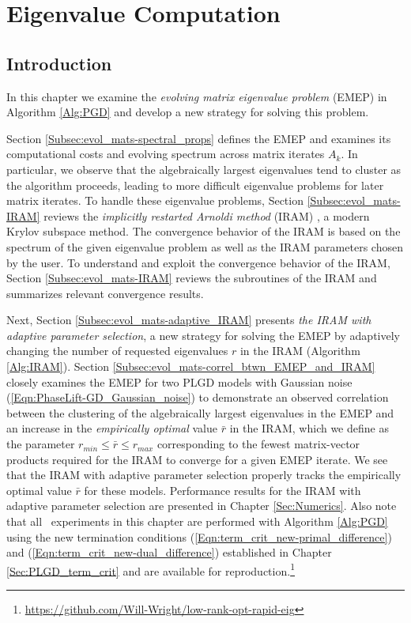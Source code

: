 \chapter{Eigenvalue Computation}		\label{Sec:evol_mats}



\section{Introduction}   \label{Subsec:evol_mats-intro}


In this chapter we examine the \textit{evolving matrix eigenvalue problem} (EMEP) in Algorithm \ref{Alg:PGD} and develop a new strategy for solving this problem.


Section \ref{Subsec:evol_mats-spectral_props} defines the EMEP and examines its computational costs and evolving spectrum across matrix iterates $A_k$.  
In particular, we observe that the algebraically largest eigenvalues tend to cluster as the algorithm proceeds, leading to more difficult eigenvalue problems for later matrix iterates.  
To handle these eigenvalue problems, Section \ref{Subsec:evol_mats-IRAM} reviews the \textit{implicitly restarted Arnoldi method} (IRAM) \cite{sorensen1992implicit}, a modern Krylov subspace method. 
The convergence behavior of the IRAM is based on the spectrum of the given eigenvalue problem as well as the IRAM parameters chosen by the user.
To understand and exploit the convergence behavior of the IRAM, Section \ref{Subsec:evol_mats-IRAM} reviews the subroutines of the IRAM and summarizes relevant convergence results.


Next, Section \ref{Subsec:evol_mats-adaptive_IRAM} presents \textit{the IRAM with adaptive parameter selection}, a new strategy for solving the EMEP by adaptively changing
the number of requested eigenvalues $r$ in the IRAM (Algorithm \ref{Alg:IRAM}).
Section \ref{Subsec:evol_mats-correl_btwn_EMEP_and_IRAM} closely examines the EMEP for two PLGD models with Gaussian noise (\ref{Eqn:PhaseLift-GD_Gaussian_noise}) to demonstrate an observed correlation between the clustering of the algebraically largest eigenvalues in the EMEP and an increase in the \textit{empirically optimal} value $\bar{r}$ in the IRAM, which we define as the parameter $r_{min} \leq \bar{r} \leq r_{max}$ corresponding to the fewest matrix-vector products required for the IRAM to converge for a given EMEP iterate.
We see that the IRAM with adaptive parameter selection properly tracks the empirically optimal value $\bar{r}$ for these models.
Performance results for the IRAM with adaptive parameter selection are presented in  Chapter \ref{Sec:Numerics}.
Also note that all \emep \ experiments in this chapter are performed with Algorithm \ref{Alg:PGD} using the new termination conditions (\ref{Eqn:term_crit_new-primal_difference}) and (\ref{Eqn:term_crit_new-dual_difference}) established in Chapter \ref{Sec:PLGD_term_crit} and are available for reproduction.\footnote{\url{https://github.com/Will-Wright/low-rank-opt-rapid-eig}}




